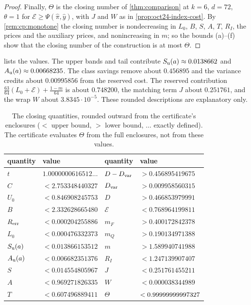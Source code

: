 \begin{proof}
Finally, $\Theta$ is the closing number of \cref{thm:comparison} at $k=6$,
$d=72$, $\theta=1$ for $\mathcal E\ge\Psi(\hat\pi,\hat y)$, with $J$ and $W$ as in
\cref{prop:oct24-index-cost}. By \cref{rem:cp:monotone} the closing number
is nondecreasing in $L_0$, $B$, $S$, $A$, $T$, $R_I$, the prices and the
auxiliary prices, and nonincreasing in $m$; so the bounds (a)--(f) show that the
closing number of the construction is at most $\Theta$.
\end{proof}

 lists the values. The upper bands and tail
contribute $S_{\rm u}(a)\approx0.0138662$ and
$A_{\rm u}(a)\approx0.00668235$. The class savings remove about $0.456895$
and the variance credits about $0.00995856$ from the reserved cost. The
reserved contribution $\frac{63}{64}(L_0+\mathcal E)+\frac{1-m}{64}$ is
about $0.748200$, the matching term $J$ about $0.251761$, and the wrap $W$
about $3.8345\cdot10^{-5}$. These rounded descriptions are explanatory only.

\begin{table}[ht]
\centering
\caption{The closing quantities, rounded outward from the certificate's
enclosures ($<$ upper bound, $>$ lower bound, $\ldots$ exactly defined).
The certificate evaluates $\Theta$ from the full enclosures, not from these
values.}
\label{tab:closing-values}
\begin{tabular}{@{}llll@{}}
\toprule
quantity & value & quantity & value\\
\midrule
$t$ & $1.0000000616512\ldots$ & $D-D_{\rm var}$ & $>0.456895419675$\\
$C$ & $<2.753348440327$ & $D_{\rm var}$ & $>0.009958560315$\\
$U_0$ & $<0.846908245753$ & $D$ & $>0.466853979991$\\
$B$ & $<2.332628665480$ & $\mathcal E$ & $<0.768964199811$\\
$R_{\rm err}$ & $<0.000204255886$ & $m_F$ & $>0.400172842378$\\
$L_0$ & $<0.000476332373$ & $m_Q$ & $>0.190134971388$\\
$S_{\rm u}(a)$ & $<0.013866153512$ & $m$ & $>1.589940741988$\\
$A_{\rm u}(a)$ & $<0.006682351376$ & $R_I$ & $<1.247139907407$\\
$S$ & $<0.014554805967$ & $J$ & $<0.251761455211$\\
$A$ & $<0.969271826335$ & $W$ & $<0.000038344989$\\
$T$ & $<0.607496889411$ & $\Theta$ & $<0.99999999997327$\\
\bottomrule
\end{tabular}
\end{table}

